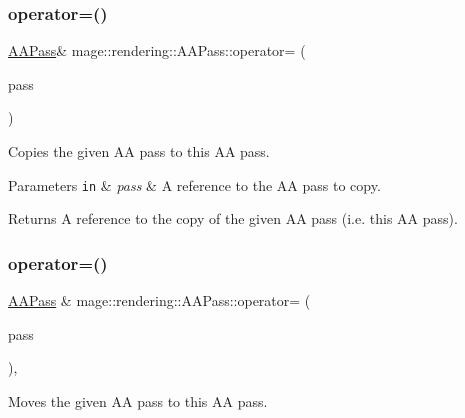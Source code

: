 \subsubsection{\texorpdfstring{operator=()}{operator=()}\hspace{0.1cm}{\footnotesize\ttfamily [1/2]}}
{\footnotesize\ttfamily \hyperlink{classmage_1_1rendering_1_1_a_a_pass}{A\+A\+Pass}\& mage\+::rendering\+::\+A\+A\+Pass\+::operator= (\begin{DoxyParamCaption}\item[{const \hyperlink{classmage_1_1rendering_1_1_a_a_pass}{A\+A\+Pass} \&}]{pass }\end{DoxyParamCaption})\hspace{0.3cm}{\ttfamily [delete]}}

Copies the given AA pass to this AA pass.


\begin{DoxyParams}[1]{Parameters}
\mbox{\tt in}  & {\em pass} & A reference to the AA pass to copy. \\
\hline
\end{DoxyParams}
\begin{DoxyReturn}{Returns}
A reference to the copy of the given AA pass (i.\+e. this AA pass). 
\end{DoxyReturn}
\hypertarget{classmage_1_1rendering_1_1_a_a_pass_a49e56b2a51acc9c99be91960a846f155}{}\label{classmage_1_1rendering_1_1_a_a_pass_a49e56b2a51acc9c99be91960a846f155} 
\subsubsection{\texorpdfstring{operator=()}{operator=()}\hspace{0.1cm}{\footnotesize\ttfamily [2/2]}}
{\footnotesize\ttfamily \hyperlink{classmage_1_1rendering_1_1_a_a_pass}{A\+A\+Pass} \& mage\+::rendering\+::\+A\+A\+Pass\+::operator= (\begin{DoxyParamCaption}\item[{\hyperlink{classmage_1_1rendering_1_1_a_a_pass}{A\+A\+Pass} \&\&}]{pass }\end{DoxyParamCaption})\hspace{0.3cm}{\ttfamily [default]}, {\ttfamily [noexcept]}}

Moves the given AA pass to this AA pass.



